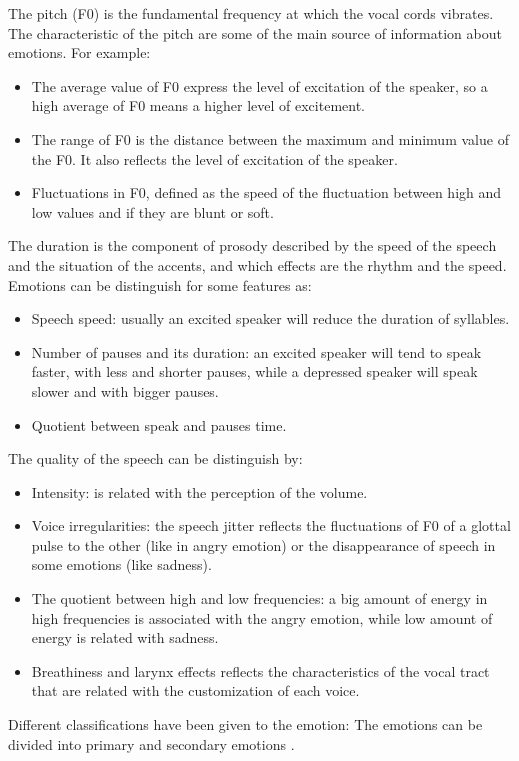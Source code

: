 The pitch (F0) is the fundamental frequency at which the vocal cords vibrates. The characteristic of the pitch are some of the main source of information about emotions. For example:
\begin{itemize}
 \item The average value of F0 express the level of excitation of the speaker, so a high average of F0 means a higher level of excitement.
 \item The range of F0 is the distance between the maximum and minimum value of the F0. It also reflects the level of excitation of the speaker.
 \item Fluctuations in F0, defined as the speed of the fluctuation between high and low values and if they are blunt or soft.
\end{itemize}
The duration is the component of prosody described by the speed of the speech and the situation of the accents, and which effects are the rhythm and the speed. Emotions can be distinguish for some features as:
\begin{itemize}
	\item Speech speed: usually an excited speaker will reduce the duration of syllables.
	\item Number of pauses and its duration: an excited speaker will tend to speak faster, with less and shorter pauses, while a depressed speaker will speak slower and with bigger pauses.
	\item Quotient between speak and pauses time.
\end{itemize}
The quality of the speech can be distinguish by:
\begin{itemize}
	\item Intensity: is related with the perception of the volume.
	\item Voice irregularities: the speech jitter reflects the fluctuations of F0 of a glottal pulse to the other (like in angry emotion) or the disappearance of speech in some emotions (like sadness).
	\item The quotient between high and low frequencies: a big amount of energy in high frequencies is associated with the angry emotion, while low amount of energy is related with sadness.
	\item Breathiness and larynx effects reflects the characteristics of the vocal tract that are related with the customization of each voice.
\end{itemize}
Different classifications have been given to the emotion:
The emotions can be divided into primary and secondary emotions \cite{goleman2006emotional}. 
